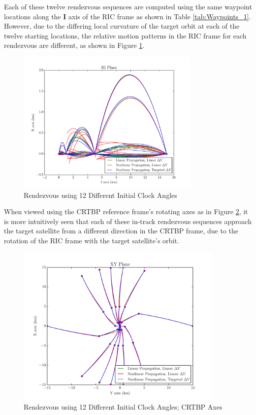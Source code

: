 \documentclass[a4paper]{article}
\begin{document}
Each of these twelve rendezvous sequences are computed using the same waypoint locations along the \(\mathbf{I}\) axis of the RIC frame as shown in Table \ref{tab:Waypoints_1}.  However, due to the differing local curvature of the target orbit at each of the twelve starting locations, the relative motion patterns in the RIC frame for each rendezvous are different, as shown in Figure \ref{fig:RIC_2}.  

\begin{figure}[h] 
	\begin{center}
		\includegraphics[width=0.8\textwidth]{RIC_2}
		\caption{Rendezvous using 12 Different Initial Clock Angles}
		\label{fig:RIC_2}
	\end{center}
\end{figure}

\clearpage

When viewed using the CRTBP reference frame's rotating axes as in Figure \ref{fig:RLP_2}, it is more intuitively seen that each of these in-track rendezvous sequences approach the target satellite from a different direction in the CRTBP frame, due to the rotation of the RIC frame with the target satellite's orbit.

\begin{figure}[h] 
	\begin{center}
		\includegraphics[width=0.9\textwidth]{RLP_2} %
		\caption{Rendezvous using 12 Different Initial Clock Angles; CRTBP Axes}
		\label{fig:RLP_2}
	\end{center}
\end{figure}
\end{document}
